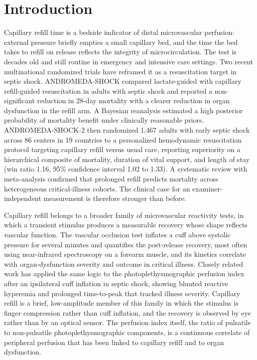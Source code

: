 \documentclass[twocolumn,letterpaper,10pt]{article}
\begin{document}
\section{Introduction}

Capillary refill time is a bedside indicator of distal microvascular perfusion: external pressure briefly empties a small capillary bed, and the time the bed takes to refill on release reflects the integrity of microcirculation. The test is decades old and still routine in emergency and intensive care settings. Two recent multinational randomized trials have reframed it as a resuscitation target in septic shock. ANDROMEDA-SHOCK compared lactate-guided with capillary refill-guided resuscitation in adults with septic shock and reported a non-significant reduction in 28-day mortality with a clearer reduction in organ dysfunction in the refill arm.\cite{hernandez2019_andromeda} A Bayesian reanalysis estimated a high posterior probability of mortality benefit under clinically reasonable priors.\cite{zampieri2020_bayesian} ANDROMEDA-SHOCK-2 then randomized 1{,}467 adults with early septic shock across 86 centers in 19 countries to a personalized hemodynamic resuscitation protocol targeting capillary refill versus usual care, reporting superiority on a hierarchical composite of mortality, duration of vital support, and length of stay (win ratio 1.16, 95\% confidence interval 1.02 to 1.33).\cite{andromedashock2_2025} A systematic review with meta-analysis confirmed that prolonged refill predicts mortality across heterogeneous critical-illness cohorts.\cite{jacquetlagreze2023_crt_metaanalysis} The clinical case for an examiner-independent measurement is therefore stronger than before.

Capillary refill belongs to a broader family of microvascular reactivity tests, in which a transient stimulus produces a measurable recovery whose shape reflects vascular function. The vascular occlusion test inflates a cuff above systolic pressure for several minutes and quantifies the post-release recovery, most often using near-infrared spectroscopy on a forearm muscle, and its kinetics correlate with organ-dysfunction severity and outcome in critical illness. Closely related work has applied the same logic to the photoplethysmographic perfusion index after an ipsilateral cuff inflation in septic shock, showing blunted reactive hyperemia and prolonged time-to-peak that tracked illness severity.\cite{menezes2018_pi_septic,menezes2019_pi_vot_mortality} Capillary refill is a brief, low-amplitude member of this family in which the stimulus is finger compression rather than cuff inflation, and the recovery is observed by eye rather than by an optical sensor. The perfusion index itself, the ratio of pulsatile to non-pulsatile photoplethysmographic components, is a continuous correlate of peripheral perfusion that has been linked to capillary refill and to organ dysfunction.\cite{sun2024_pi_review}
\end{document}
